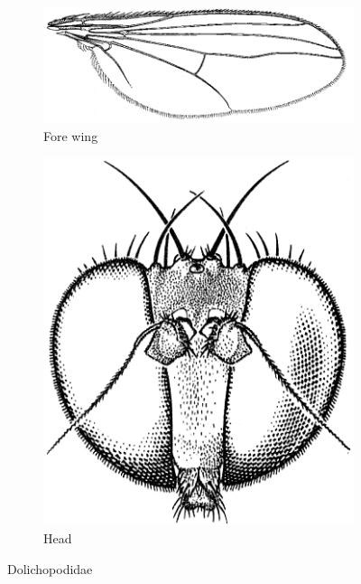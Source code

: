 \documentclass[letterpaper, 11pt]{article}
\begin{document}
\begin{figure}[ht!]
    \centering
    \begin{subfigure}[ht!]{0.5\textwidth}
        \includegraphics[width=\textwidth]{DolichopodidWing}
        \caption{Fore wing \citep[][Fig. 48.30]{mcalpine1981manual}}
        \label{fig:dolicho1}
    \end{subfigure}
    \qquad
    \begin{subfigure}[ht!]{0.22\textwidth}
        \includegraphics[width=\textwidth]{DolichopodidHead}
        \caption{Head \citep[][Fig. 48.4]{mcalpine1981manual}}
        \label{fig:dolicho2}
    \end{subfigure}
    \caption{Dolichopodidae}\label{fig:dolichos}
\end{figure}
\end{document}
